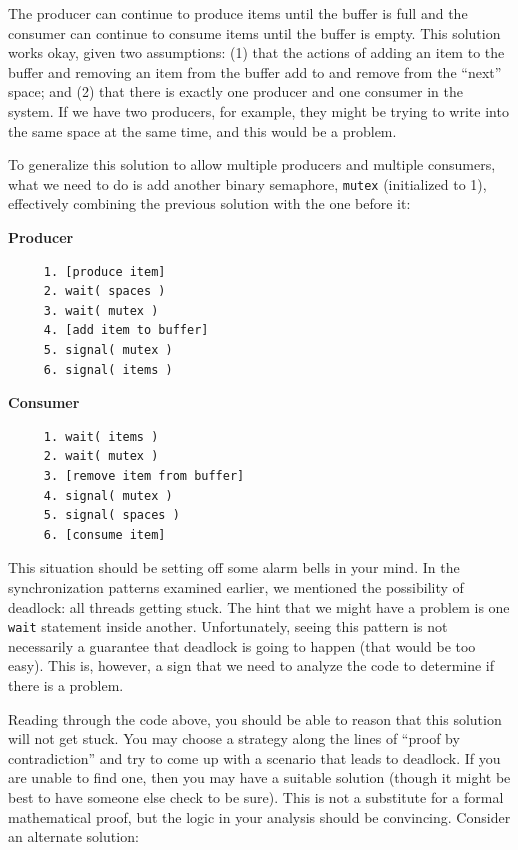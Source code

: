 The producer can continue to produce items until the buffer is full and the consumer can continue to consume items until the buffer is empty. This solution works okay, given two assumptions: (1) that the actions of adding an item to the buffer and removing an item from the buffer add to and remove from the ``next'' space; and (2) that there is exactly one producer and one consumer in the system. If we have two producers, for example, they might be trying to write into the same space at the same time, and this would be a problem. 

To generalize this solution to allow multiple producers and multiple consumers, what we need to do is add another binary semaphore, \texttt{mutex} (initialized to 1), effectively combining the previous solution with the one before it:

\begin{multicols}{2}
\textbf{Producer}\vspace{-2em}
  \begin{verbatim}
	 1. [produce item]
	 2. wait( spaces )
	 3. wait( mutex )
	 4. [add item to buffer]
	 5. signal( mutex )
	 6. signal( items )
  \end{verbatim}
\columnbreak
\textbf{Consumer}\vspace{-2em}
  \begin{verbatim}
	 1. wait( items )
	 2. wait( mutex )
	 3. [remove item from buffer]
	 4. signal( mutex )
	 5. signal( spaces )
	 6. [consume item]
  \end{verbatim}
\end{multicols}
\vspace{-2em}

This situation should be setting off some alarm bells in your mind. In the synchronization patterns examined earlier, we mentioned the possibility of deadlock: all threads getting stuck. The hint that we might have a problem is one \texttt{wait} statement inside another. Unfortunately, seeing this pattern is not necessarily a guarantee that deadlock is going to happen (that would be too easy). This is, however, a sign that we need to analyze the code to determine if there is a problem. 

Reading through the code above, you should be able to reason that this solution will not get stuck. You may choose a strategy along the lines of ``proof by contradiction'' and try to come up with a scenario that leads to deadlock. If you are unable to find one, then you may have a suitable solution (though it might be best to have someone else check to be sure). This is not a substitute for a formal mathematical proof, but the logic in your analysis should be convincing. Consider an alternate solution:

